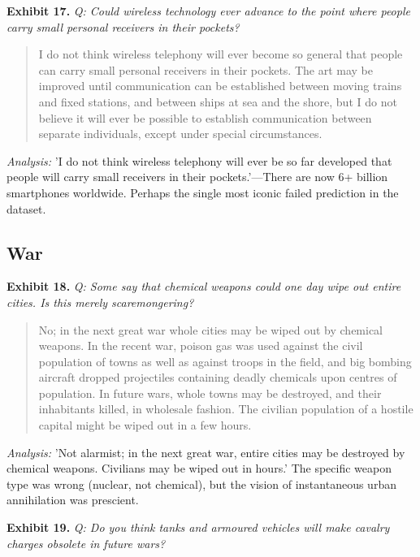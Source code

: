 \documentclass[11pt]{article}
\begin{document}
\noindent\textbf{Exhibit 17.} \textit{Q: Could wireless technology ever advance to the point where people carry small personal receivers in their pockets?}

\begin{quote}
\small I do not think wireless telephony will ever become so general that people can carry small personal receivers in their pockets. The art may be improved until communication can be established between moving trains and fixed stations, and between ships at sea and the shore, but I do not believe it will ever be possible to establish communication between separate individuals, except under special circumstances.
\end{quote}
\noindent\textit{Analysis:} 'I do not think wireless telephony will ever be so far developed that people will carry small receivers in their pockets.'---There are now 6+ billion smartphones worldwide. Perhaps the single most iconic failed prediction in the dataset.

\subsection*{War}

\noindent\textbf{Exhibit 18.} \textit{Q: Some say that chemical weapons could one day wipe out entire cities. Is this merely scaremongering?}

\begin{quote}
\small No; in the next great war whole cities may be wiped out by chemical weapons. In the recent war, poison gas was used against the civil population of towns as well as against troops in the field, and big bombing aircraft dropped projectiles containing deadly chemicals upon centres of population. In future wars, whole towns may be destroyed, and their inhabitants killed, in wholesale fashion. The civilian population of a hostile capital might be wiped out in a few hours.
\end{quote}
\noindent\textit{Analysis:} 'Not alarmist; in the next great war, entire cities may be destroyed by chemical weapons. Civilians may be wiped out in hours.' The specific weapon type was wrong (nuclear, not chemical), but the vision of instantaneous urban annihilation was prescient.

\noindent\textbf{Exhibit 19.} \textit{Q: Do you think tanks and armoured vehicles will make cavalry charges obsolete in future wars?}
\end{document}
